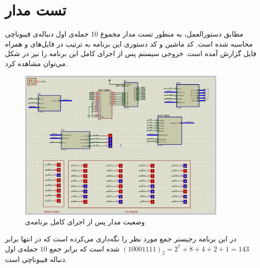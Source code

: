 \documentclass[12pt,onecolumn,a4paper,fleqn]{article}
\begin{document}
	\section{تست مدار}
	مطابق دستورالعمل، به منظور تست مدار مجموع 10 جمله‌ی اول دنباله‌ی فیبوناچی محاسبه شده است. کد ماشین و کد دستوری این برنامه به ترتیب در فایل‌های
	و
	همراه فایل گزارش آمده است. خروجی سیستم پس از اجرای کامل این برنامه را نیز در شکل
	می‌توان مشاهده کرد.
	\begin{figure}[H]
		\centering
		\includegraphics[width=0.9\textwidth]{source/fibo_final.png}
		\caption{وضعیت مدار پس از اجرای کامل برنامه‌ی }
		\label{fig:fibo}
	\end{figure}
	در این برنامه رجیستر
	جمع مورد نظر را نگه‌داری می‌کرده است که در انتها برابر
	$(10001111)_2 = 2^7 + 8 + 4 + 2 + 1 = 143$
	شده است که برابر جمع 10 جمله‌ی اول دنباله فیبوناچی است.
\end{document}
